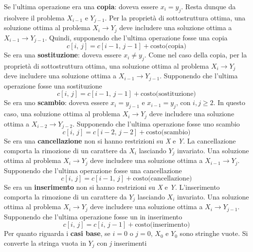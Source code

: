 \documentclass[10pt, a4paper]{report}
\begin{document}
Se l'ultima operazione era una \textbf{copia}: doveva essere $x_i = y_j$. Resta dunque da risolvere il problema $X_{i-1}$ e $Y_{j-1}$. Per la proprietà di sottostruttura ottima, una soluzione ottima al problema $X_i \rightarrow Y_j$ deve includere una soluzione ottima a $X_{i-1} \rightarrow Y_{j-1}$. Quindi, supponendo che l'ultima operazione fosse una copia
\begin{equation*}
c[i,\,j] = c[i - 1,\,j - 1] + \text{costo(copia)}
\end{equation*}
Se era una \textbf{sostituzione}: doveva essere  $x_i \neq y_j$. Come nel caso della copia, per la proprietà di sottostruttura ottima, una soluzione ottima al problema $X_i \rightarrow Y_j$ deve includere una soluzione ottima a $X_{i-1} \rightarrow Y_{j-1}$. Supponendo che l'ultima operazione fosse una sostituzione
\begin{equation*}
c[i,\,j] = c[i - 1,\,j - 1] + \text{costo(sostituzione)}
\end{equation*}
Se era uno \textbf{scambio}: doveva essere $x_i = y_{j-1}$ e $x_{i-1} = y_j$, con $i,j \geq 2$. In questo caso, una soluzione ottima al problema $X_i \rightarrow Y_j$ deve includere una soluzione ottima a $X_{i-2} \rightarrow Y_{j-2}$. Supponendo che l'ultima operazione fosse uno scambio
\begin{equation*}
c[i,\,j] = c[i - 2,\,j - 2] + \text{costo(scambio)}
\end{equation*}
Se era una \textbf{cancellazione} non si hanno restrizioni su \textit{X} e \textit{Y}. La cancellazione comporta la rimozione di un carattere da $X_i$ lasciando $Y_j$ invariato. Una soluzione ottima al problema $X_i \rightarrow Y_j$ deve includere una soluzione ottima a $X_{i-1} \rightarrow Y_j$. Supponendo che l'ultima operazione fosse una cancellazione
\begin{equation*}
c[i,\,j] = c[i - 1,\,j] + \text{costo(cancellazione)}
\end{equation*}
Se era un \textbf{inserimento} non si hanno restrizioni su \textit{X} e \textit{Y}. L'inserimento comporta la rimozione di un carattere da $Y_j$ lasciando $X_i$ invariato. Una soluzione ottima al problema $X_i \rightarrow Y_j$ deve includere una soluzione ottima a $X_i \rightarrow Y_{j-1}$. Supponendo che l'ultima operazione fosse un in inserimento
\begin{equation*}
c[i,\,j] = c[i,\,j - 1] + \text{costo(inserimento)}
\end{equation*}
Per quanto riguarda i \textbf{casi base}, se $i = 0$ o $j = 0$, $X_0$ e $Y_0$ sono stringhe vuote. Si converte la stringa vuota in $Y_j$ con \textit{j} inserimenti
\end{document}
